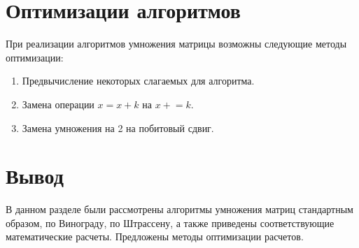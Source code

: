 \section{Оптимизации алгоритмов}
При реализации алгоритмов умножения матрицы возможны следующие методы оптимизации:
\begin{enumerate}
	\item Предвычисление некоторых слагаемых для алгоритма.
	\item Замена операции $x = x + k$ на $x \mathrel{+}= k$.
	\item Замена умножения на 2 на побитовый сдвиг.
\end{enumerate} 

\section*{Вывод}
В данном разделе были рассмотрены алгоритмы умножения матриц стандартным образом, по Винограду, по Штрассену, а также приведены соответствующие математические расчеты. Предложены методы оптимизации расчетов.